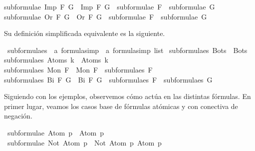 \begin{isabellebody}
{\isachardoublequoteopen}subformulae\ {\isacharparenleft}Imp\ F\ G{\isacharparenright}\ {\isacharequal}\ Imp\ F\ G\ {\isacharhash}\ subformulae\ F\ {\isacharat}\ subformulae\ G{\isachardoublequoteclose}\ {\isacharbar}\isanewline
{\isachardoublequoteopen}subformulae\ {\isacharparenleft}Or\ F\ G{\isacharparenright}\ {\isacharequal}\ Or\ F\ G\ {\isacharhash}\ subformulae\ F\ {\isacharat}\ subformulae\ G{\isachardoublequoteclose}%
\begin{isamarkuptext}%
Su definición simplificada equivalente es la siguiente.%
\end{isamarkuptext}\isamarkuptrue%
\isamarkupfalse%
\ subformulae{\isacharunderscore}s\ {\isacharcolon}{\isacharcolon}\ {\isachardoublequoteopen}{\isacharprime}a\ formula{\isacharunderscore}simp\ {\isasymRightarrow}\ {\isacharprime}a\ formula{\isacharunderscore}simp\ list{\isachardoublequoteclose}\ \isanewline
{\isachardoublequoteopen}subformulae{\isacharunderscore}s\ {\isacharparenleft}Bot{\isacharunderscore}s{\isacharparenright}\ {\isacharequal}\ {\isacharbrackleft}Bot{\isacharunderscore}s{\isacharbrackright}{\isachardoublequoteclose}\ {\isacharbar}\isanewline
{\isachardoublequoteopen}subformulae{\isacharunderscore}s\ {\isacharparenleft}Atom{\isacharunderscore}s\ k{\isacharparenright}\ {\isacharequal}\ {\isacharbrackleft}Atom{\isacharunderscore}s\ k{\isacharbrackright}{\isachardoublequoteclose}\ {\isacharbar}\isanewline
{\isachardoublequoteopen}subformulae{\isacharunderscore}s\ {\isacharparenleft}Mon\ F{\isacharparenright}\ {\isacharequal}\ Mon\ F\ {\isacharhash}\ subformulae{\isacharunderscore}s\ F{\isachardoublequoteclose}\ {\isacharbar}\isanewline
{\isachardoublequoteopen}subformulae{\isacharunderscore}s\ {\isacharparenleft}Bi\ F\ G{\isacharparenright}\ {\isacharequal}\ Bi\ F\ G\ {\isacharhash}\ subformulae{\isacharunderscore}s\ F\ {\isacharat}\ subformulae{\isacharunderscore}s\ G{\isachardoublequoteclose}%
\begin{isamarkuptext}%
Siguiendo con los ejemplos, observemos cómo actúa  en las distintas fórmulas. 
En primer lugar, veamos los casos base de fórmulas atómicas y con conectiva de negación.%
\end{isamarkuptext}\isamarkuptrue%
\isamarkupfalse%
\ {\isachardoublequoteopen}subformulae\ {\isacharparenleft}Atom\ p{\isacharparenright}\ {\isacharequal}\ {\isacharbrackleft}Atom\ p{\isacharbrackright}{\isachardoublequoteclose}\isanewline
\isanewline
{}\isamarkupfalse%
\ {\isachardoublequoteopen}subformulae\ {\isacharparenleft}Not\ {\isacharparenleft}Atom\ p{\isacharparenright}{\isacharparenright}\ {\isacharequal}\ {\isacharbrackleft}Not\ {\isacharparenleft}Atom\ p{\isacharparenright}{\isacharcomma}\ Atom\ p{\isacharbrackright}{\isachardoublequoteclose}%

\end{isabellebody}
